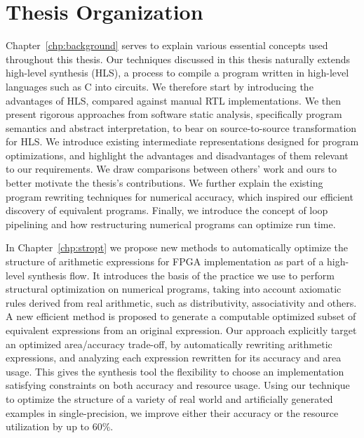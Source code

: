 \section{Thesis Organization}

Chapter~\ref{chp:background} serves to explain various essential concepts
used throughout this thesis.  Our techniques discussed in this thesis
naturally extends high-level synthesis (HLS), a process to compile a program
written in high-level languages such as C into circuits.  We therefore
start by introducing the advantages of HLS, compared against manual RTL
implementations.  We then present rigorous approaches from software static
analysis, specifically program semantics and abstract interpretation, to
bear on source-to-source transformation for HLS\@.  We introduce existing
intermediate representations designed for program optimizations, and highlight
the advantages and disadvantages of them relevant to our requirements.  We
draw comparisons between others' work and ours to better motivate the thesis's
contributions.  We further explain the existing program rewriting techniques
for numerical accuracy, which inspired our efficient discovery of equivalent
programs.  Finally, we introduce the concept of loop pipelining and how
restructuring numerical programs can optimize run time.

In Chapter~\ref{chp:stropt} we propose new methods to automatically optimize
the structure of arithmetic expressions for FPGA implementation as part of
a high-level synthesis flow.  It introduces the basis of the practice we
use to perform structural optimization on numerical programs, taking into
account axiomatic rules derived from real arithmetic, such as distributivity,
associativity and others.  A new efficient method is proposed to generate
a computable optimized subset of equivalent expressions from an original
expression.  Our approach explicitly target an optimized area/accuracy
trade-off, by automatically rewriting arithmetic expressions, and analyzing
each expression rewritten for its accuracy and area usage.  This gives
the synthesis tool the flexibility to choose an implementation satisfying
constraints on both accuracy and resource usage.  Using our technique to
optimize the structure of a variety of real world and artificially generated
examples in single-precision, we improve either their accuracy or the resource
utilization by up to 60\%.

